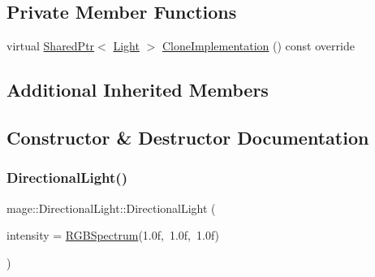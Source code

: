 \subsection*{Private Member Functions}
\begin{DoxyCompactItemize}
\item 
virtual \hyperlink{namespacemage_a1e01ae66713838a7a67d30e44c67703e}{Shared\+Ptr}$<$ \hyperlink{classmage_1_1_light}{Light} $>$ \hyperlink{classmage_1_1_directional_light_a93479af178401eeaf6fe0f16b1f97ad9}{Clone\+Implementation} () const override
\end{DoxyCompactItemize}
\subsection*{Additional Inherited Members}


\subsection{Constructor \& Destructor Documentation}
\hypertarget{classmage_1_1_directional_light_a67df04219f61a8350045e5743b1de284}{}\label{classmage_1_1_directional_light_a67df04219f61a8350045e5743b1de284} 
\subsubsection{\texorpdfstring{Directional\+Light()}{DirectionalLight()}\hspace{0.1cm}{\footnotesize\ttfamily [1/3]}}
{\footnotesize\ttfamily mage\+::\+Directional\+Light\+::\+Directional\+Light (\begin{DoxyParamCaption}\item[{const \hyperlink{structmage_1_1_r_g_b_spectrum}{R\+G\+B\+Spectrum} \&}]{intensity = {\ttfamily \hyperlink{structmage_1_1_r_g_b_spectrum}{R\+G\+B\+Spectrum}(1.0f,~1.0f,~1.0f)} }\end{DoxyParamCaption})\hspace{0.3cm}{\ttfamily [explicit]}}

\hypertarget{classmage_1_1_directional_light_a6939817ef5aeb6347d6d1aa963241f49}{}\label{classmage_1_1_directional_light_a6939817ef5aeb6347d6d1aa963241f49} 
